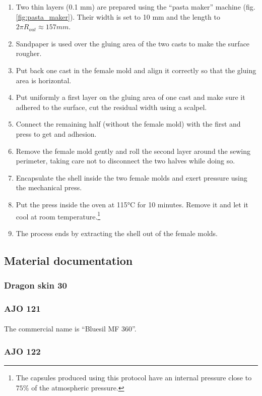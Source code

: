 \begin{enumerate}
	\item Two thin layers (0.1 mm) are prepared using the "`pasta maker"' machine (fig.\ref{fig:pasta_maker}). Their width is set to 10 mm and the length to $2\pi R_{out} \approx 157 mm$.
	\item Sandpaper is used over the gluing area of the two casts to make the surface rougher.
	\item Put back one cast in the female mold and align it correctly so that the gluing area is horizontal.
	\item Put uniformly a first layer on the gluing area of one cast and make sure it adhered to the surface, cut the residual width using a scalpel.
	\item Connect the remaining half (without the female mold) with the first and press to get and adhesion.
	\item Remove the female mold gently and roll the second layer around the sewing perimeter, taking care not to disconnect the two halves while doing so.
	\item Encapsulate the shell inside the two female molds and exert pressure using the mechanical press.
	\item Put the press inside the oven at 115°C for 10 minutes. Remove it and let it cool at room temperature.\footnote{The capsules produced using this protocol have an internal pressure close to $75\%$ of the atmospheric pressure.}
	\item The process ends by extracting the shell out of the female molds.
\end{enumerate}
\subsection{Material documentation}
\subsubsection{Dragon skin 30}

\subsubsection{AJO 121}
\paragraph{}
The commercial name is "`Bluesil MF 360"'.

\subsubsection{AJO 122}
